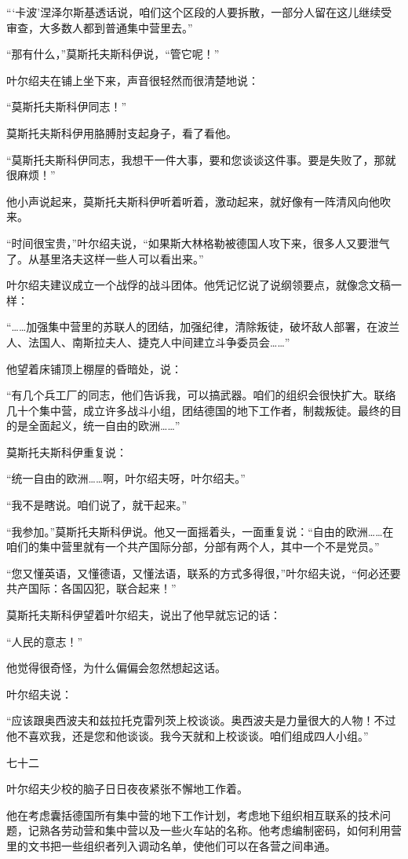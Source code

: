 “‘卡波’涅泽尔斯基透话说，咱们这个区段的人要拆散，一部分人留在这儿继续受审查，大多数人都到普通集中营里去。”

“那有什么，”莫斯托夫斯科伊说，“管它呢！”

叶尔绍夫在铺上坐下来，声音很轻然而很清楚地说：

“莫斯托夫斯科伊同志！”

莫斯托夫斯科伊用胳膊肘支起身子，看了看他。

“莫斯托夫斯科伊同志，我想干一件大事，要和您谈谈这件事。要是失败了，那就很麻烦！”

他小声说起来，莫斯托夫斯科伊听着听着，激动起来，就好像有一阵清风向他吹来。

“时间很宝贵，”叶尔绍夫说，“如果斯大林格勒被德国人攻下来，很多人又要泄气了。从基里洛夫这样一些人可以看出来。”

叶尔绍夫建议成立一个战俘的战斗团体。他凭记忆说了说纲领要点，就像念文稿一样：

“……加强集中营里的苏联人的团结，加强纪律，清除叛徒，破坏敌人部署，在波兰人、法国人、南斯拉夫人、捷克人中间建立斗争委员会……”

他望着床铺顶上棚屋的昏暗处，说：

“有几个兵工厂的同志，他们告诉我，可以搞武器。咱们的组织会很快扩大。联络几十个集中营，成立许多战斗小组，团结德国的地下工作者，制裁叛徒。最终的目的是全面起义，统一自由的欧洲……”

莫斯托夫斯科伊重复说：

“统一自由的欧洲……啊，叶尔绍夫呀，叶尔绍夫。”

“我不是瞎说。咱们说了，就干起来。”

“我参加。”莫斯托夫斯科伊说。他又一面摇着头，一面重复说：“自由的欧洲……在咱们的集中营里就有一个共产国际分部，分部有两个人，其中一个不是党员。”

“您又懂英语，又懂德语，又懂法语，联系的方式多得很，”叶尔绍夫说，“何必还要共产国际：各国囚犯，联合起来！”

莫斯托夫斯科伊望着叶尔绍夫，说出了他早就忘记的话：

“人民的意志！”

他觉得很奇怪，为什么偏偏会忽然想起这话。

叶尔绍夫说：

“应该跟奥西波夫和兹拉托克雷列茨上校谈谈。奥西波夫是力量很大的人物！不过他不喜欢我，还是您和他谈谈。我今天就和上校谈谈。咱们组成四人小组。”

七十二

叶尔绍夫少校的脑子日日夜夜紧张不懈地工作着。

他在考虑囊括德国所有集中营的地下工作计划，考虑地下组织相互联系的技术问题，记熟各劳动营和集中营以及一些火车站的名称。他考虑编制密码，如何利用营里的文书把一些组织者列入调动名单，使他们可以在各营之间串通。


